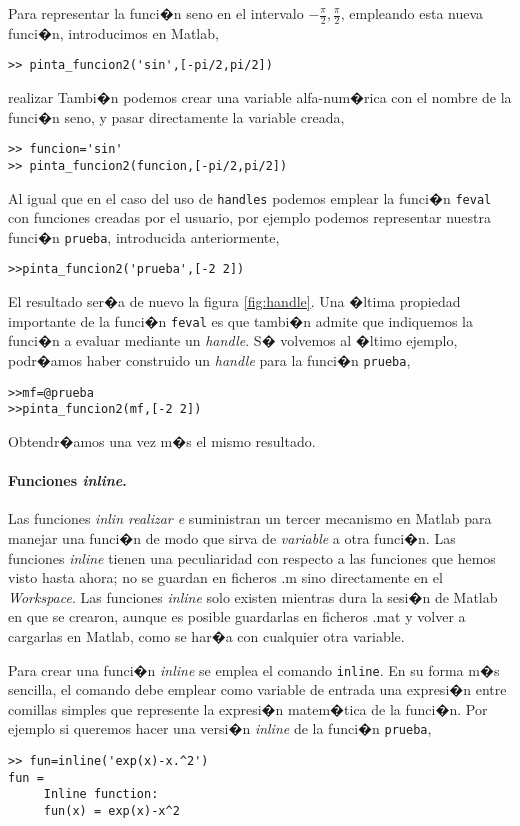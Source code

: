 Para representar la funci�n seno en el intervalo $-\frac{\pi}{2}, \frac{\pi}{2}$, empleando esta nueva funci�n, introducimos en Matlab,

\begin{verbatim}
>> pinta_funcion2('sin',[-pi/2,pi/2])
\end{verbatim}
 realizar 
Tambi�n podemos crear una variable alfa-num�rica con el nombre de la funci�n seno, y pasar directamente la variable creada,

\begin{verbatim}
>> funcion='sin'
>> pinta_funcion2(funcion,[-pi/2,pi/2])
\end{verbatim}

Al igual que en el caso del uso de \texttt{handles} podemos emplear la funci�n \texttt{feval} con funciones creadas por el usuario, por ejemplo podemos representar nuestra funci�n \texttt{prueba}, introducida anteriormente, 

\begin{verbatim}
>>pinta_funcion2('prueba',[-2 2])
\end{verbatim}

El resultado ser�a de nuevo la figura \ref{fig:handle}.  Una �ltima propiedad importante de la funci�n \texttt{feval} es que tambi�n admite que indiquemos la funci�n a evaluar mediante un \emph{handle}. S� volvemos al �ltimo ejemplo, podr�amos haber construido un \emph{handle} para la funci�n \texttt{prueba},
\begin{verbatim}
>>mf=@prueba
>>pinta_funcion2(mf,[-2 2])
\end{verbatim} 

Obtendr�amos una vez m�s el mismo resultado.

\paragraph{Funciones \emph{inline}.}  Las funciones \emph{inlin realizar e} suministran un tercer mecanismo en Matlab para manejar una funci�n de modo que sirva de \emph{variable}  a otra funci�n. Las funciones \emph{inline} tienen una peculiaridad con respecto a las funciones que hemos visto hasta ahora; no se guardan en ficheros .m sino directamente en el \emph{Workspace}. Las funciones \emph{inline} solo existen mientras dura la sesi�n de Matlab en que se crearon, aunque es posible guardarlas en ficheros .mat y volver a cargarlas en Matlab, como se har�a con cualquier otra variable.

Para crear una funci�n \emph{inline} se emplea el comando \texttt{inline}. En su forma m�s sencilla, el comando debe emplear como variable de entrada una expresi�n entre comillas simples que represente la expresi�n matem�tica de la funci�n. Por ejemplo si queremos hacer una versi�n \emph{inline} de la funci�n \texttt{prueba},
\begin{verbatim}
>> fun=inline('exp(x)-x.^2')
fun =
     Inline function:
     fun(x) = exp(x)-x^2
\end{verbatim}

